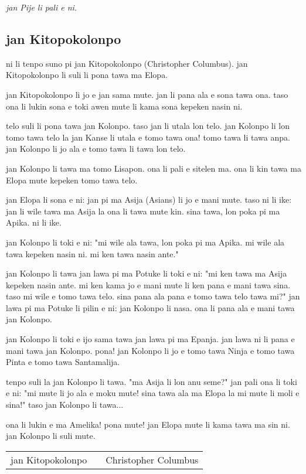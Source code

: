 \textit{jan Pije li pali e ni. \cite{www:Pije:01}}
%
\newpage
\subsection{jan Kitopokolonpo}

ni li tenpo suno pi jan Kitopokolonpo (Christopher Columbus).
jan Kitopokolonpo li suli li pona tawa ma Elopa.

jan Kitopokolonpo li jo e jan sama mute.
jan li pana ala e sona tawa ona.
taso ona li lukin sona e toki awen mute li kama sona kepeken nasin ni.

telo suli li pona tawa jan Kolonpo.
taso jan li utala lon telo.
jan Kolonpo li lon tomo tawa telo la jan Kanse li utala e tomo tawa ona!
tomo tawa li tawa anpa. jan Kolonpo li jo ala e tomo tawa li tawa lon
telo.

jan Kolonpo li tawa ma tomo Lisapon. ona li pali e sitelen ma. ona li
kin tawa ma Elopa mute kepeken tomo tawa telo.

jan Elopa li sona e ni: jan pi ma Asija (Asians) li jo e mani mute.
taso ni li ike: jan li wile tawa ma Asija la ona li tawa mute kin.
sina tawa, lon poka pi ma Apika. ni li ike.

jan Kolonpo li toki e ni: "mi wile ala tawa, lon poka pi ma Apika. mi
wile ala tawa kepeken nasin ni. mi ken tawa nasin ante."

jan Kolonpo li tawa jan lawa pi ma Potuke li toki e ni: "mi ken tawa
ma Asija kepeken nasin ante. mi ken kama jo e mani mute li ken pana e
mani tawa sina. taso mi wile e tomo tawa telo. sina pana ala pana e
tomo tawa telo tawa mi?" jan lawa pi ma Potuke li pilin e ni: jan
Kolonpo li nasa. ona li pana ala e mani tawa jan Kolonpo.

jan Kolonpo li toki e ijo sama tawa jan lawa pi ma Epanja. jan lawa
ni li pana e mani tawa jan Kolonpo. pona! jan Kolonpo li jo e tomo
tawa Ninja e tomo tawa Pinta e tomo tawa Santamalija.

tenpo suli la jan Kolonpo li tawa. "ma Asija li lon anu seme?" jan
pali ona li toki e ni: "mi mute li jo ala e moku mute! sina tawa ala
ma Elopa la mi mute li moli e sina!" taso jan Kolonpo li tawa...

ona li lukin e ma Amelika! pona mute! jan Elopa mute li kama tawa ma
sin ni. jan Kolonpo li suli mute.

\begin{supertabular}{p{5,5cm}|ll}
    jan Kitopokolonpo &  & Christopher Columbus \\
\end{supertabular}

